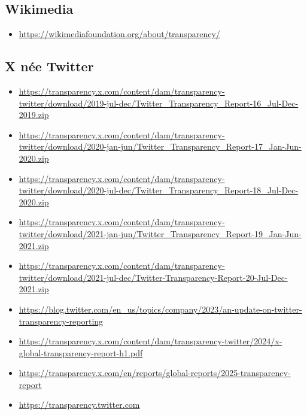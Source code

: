 {{{\subsection*{Wikimedia}

{\footnotesize
\begin{itemize}
\item[]\url{https://wikimediafoundation.org/about/transparency/}
\end{itemize}
}}}


\subsection*{X née Twitter}

{\footnotesize
\begin{itemize}
\item[]\url{https://transparency.x.com/content/dam/transparency-twitter/download/2019-jul-dec/Twitter_Transparency_Report-16_Jul-Dec-2019.zip}
\item[]\url{https://transparency.x.com/content/dam/transparency-twitter/download/2020-jan-jun/Twitter_Transparency_Report-17_Jan-Jun-2020.zip}
\item[]\url{https://transparency.x.com/content/dam/transparency-twitter/download/2020-jul-dec/Twitter_Transparency_Report-18_Jul-Dec-2020.zip}
\item[]\url{https://transparency.x.com/content/dam/transparency-twitter/download/2021-jan-jun/Twitter_Transparency_Report-19_Jan-Jun-2021.zip}
\item[]\url{https://transparency.x.com/content/dam/transparency-twitter/download/2021-jul-dec/Twitter-Transparency-Report-20-Jul-Dec-2021.zip}
\item[]\url{https://blog.twitter.com/en_us/topics/company/2023/an-update-on-twitter-transparency-reporting}
\item[]\url{https://transparency.x.com/content/dam/transparency-twitter/2024/x-global-transparency-report-h1.pdf}
\item[]\url{https://transparency.x.com/en/reports/global-reports/2025-transparency-report}
\item[]\url{https://transparency.twitter.com}
\end{itemize}
}

}
